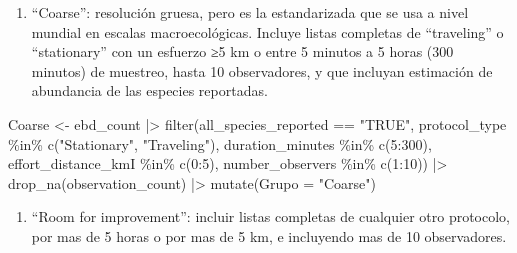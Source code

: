 \documentclass[
]{article}
\newenvironment{Shaded}{\begin{snugshade}}{\end{snugshade}}
\newcommand{\AttributeTok}[1]{\textcolor[rgb]{0.77,0.63,0.00}{#1}}
\newcommand{\DecValTok}[1]{\textcolor[rgb]{0.00,0.00,0.81}{#1}}
\newcommand{\FunctionTok}[1]{\textcolor[rgb]{0.00,0.00,0.00}{#1}}
\newcommand{\NormalTok}[1]{#1}
\newcommand{\OtherTok}[1]{\textcolor[rgb]{0.56,0.35,0.01}{#1}}
\newcommand{\SpecialCharTok}[1]{\textcolor[rgb]{0.00,0.00,0.00}{#1}}
\newcommand{\StringTok}[1]{\textcolor[rgb]{0.31,0.60,0.02}{#1}}
\providecommand{\tightlist}{%
  \setlength{\itemsep}{0pt}\setlength{\parskip}{0pt}}
\begin{document}
\begin{enumerate}
\def\labelenumi{\arabic{enumi}.}
\setcounter{enumi}{2}
\tightlist
\item
  ``Coarse'': resolución gruesa, pero es la estandarizada que se usa a
  nivel mundial en escalas macroecológicas. Incluye listas completas de
  ``traveling'' o ``stationary'' con un esfuerzo ≥5 km o entre 5 minutos
  a 5 horas (300 minutos) de muestreo, hasta 10 observadores, y que
  incluyan estimación de abundancia de las especies reportadas.
\end{enumerate}

\begin{Shaded}
\begin{Highlighting}[]
\NormalTok{Coarse }\OtherTok{\textless{}{-}}\NormalTok{ ebd\_count }\SpecialCharTok{|\textgreater{}}
  \FunctionTok{filter}\NormalTok{(all\_species\_reported }\SpecialCharTok{==} \StringTok{"TRUE"}\NormalTok{,}
\NormalTok{         protocol\_type }\SpecialCharTok{\%in\%} \FunctionTok{c}\NormalTok{(}\StringTok{"Stationary"}\NormalTok{, }\StringTok{"Traveling"}\NormalTok{),}
\NormalTok{         duration\_minutes }\SpecialCharTok{\%in\%} \FunctionTok{c}\NormalTok{(}\DecValTok{5}\SpecialCharTok{:}\DecValTok{300}\NormalTok{),}
\NormalTok{         effort\_distance\_kmI }\SpecialCharTok{\%in\%} \FunctionTok{c}\NormalTok{(}\DecValTok{0}\SpecialCharTok{:}\DecValTok{5}\NormalTok{), }
\NormalTok{         number\_observers }\SpecialCharTok{\%in\%} \FunctionTok{c}\NormalTok{(}\DecValTok{1}\SpecialCharTok{:}\DecValTok{10}\NormalTok{)) }\SpecialCharTok{|\textgreater{}}
  \FunctionTok{drop\_na}\NormalTok{(observation\_count) }\SpecialCharTok{|\textgreater{}}
  \FunctionTok{mutate}\NormalTok{(}\AttributeTok{Grupo =} \StringTok{"Coarse"}\NormalTok{)}
\end{Highlighting}
\end{Shaded}

\begin{enumerate}
\def\labelenumi{\arabic{enumi}.}
\setcounter{enumi}{3}
\tightlist
\item
  ``Room for improvement'': incluir listas completas de cualquier otro
  protocolo, por mas de 5 horas o por mas de 5 km, e incluyendo mas de
  10 observadores.
\end{enumerate}
\end{document}
